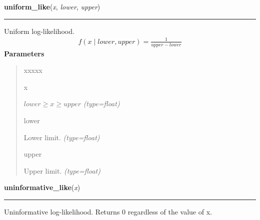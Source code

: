 \hspace{.8\funcindent}\begin{boxedminipage}{\funcwidth}

    \raggedright \textbf{uniform\_like}(\textit{x}, \textit{lower}, \textit{upper})

    \vspace{-1.5ex}

    \rule{\textwidth}{0.5\fboxrule}
\setlength{\parskip}{2ex}

Uniform log-likelihood.
\begin{equation*}\begin{split}f(x \mid lower, upper) = \frac{1}{upper-lower}\end{split}\end{equation*}\setlength{\parskip}{1ex}
      \textbf{Parameters}
      \vspace{-1ex}

      \begin{quote}
        \begin{Ventry}{xxxxx}

          \item[x]


$lower \geq x \geq upper$
            {\it (type=float)}

          \item[lower]


Lower limit.
            {\it (type=float)}

          \item[upper]


Upper limit.
            {\it (type=float)}

        \end{Ventry}

      \end{quote}

    \end{boxedminipage}

    \label{pymc:distributions:uninformative_like}

    \vspace{0.5ex}

\hspace{.8\funcindent}\begin{boxedminipage}{\funcwidth}

    \raggedright \textbf{uninformative\_like}(\textit{x})

    \vspace{-1.5ex}

    \rule{\textwidth}{0.5\fboxrule}
\setlength{\parskip}{2ex}

Uninformative log-likelihood. Returns 0 regardless of the value of x.
\setlength{\parskip}{1ex}
    \end{boxedminipage}

